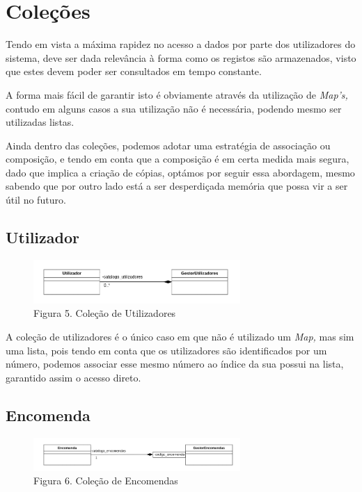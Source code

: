 \chapter{Coleções}

    Tendo em vista a máxima rapidez no acesso a dados por parte dos utilizadores do sistema, deve ser dada relevância à forma como os registos são armazenados, visto que estes devem poder ser consultados em tempo constante.

    A forma mais fácil de garantir isto é obviamente através da utilização de \textit{Map's,} contudo em alguns casos a sua utilização não é necessária, podendo mesmo ser utilizadas listas.

    Ainda dentro das coleções, podemos adotar uma estratégia de associação ou composição, e tendo em conta que a composição é em certa medida mais segura, dado que implica a criação de cópias, optámos por seguir essa abordagem, mesmo sabendo que por outro lado está a ser desperdiçada memória que possa vir a ser útil no futuro.

    \section{Utilizador}

    \begin{figure}[hb!]
        \centering
        \vspace{-10pt}
        \includegraphics[width=0.7\textwidth]{imagens/5.png}
        \caption*{Figura 5. Coleção de Utilizadores}
    \end{figure}
    \vspace{8pt}

    A coleção de utilizadores é o único caso em que não é utilizado um \textit{Map,} mas sim uma lista, pois tendo em conta que os utilizadores são identificados por um número, podemos associar esse mesmo número ao índice da sua possui na lista, garantido assim o acesso direto.

    \section{Encomenda}

    \begin{figure}[hb!]
        \centering
        \vspace{-5pt}
        \includegraphics[width=0.7\textwidth]{imagens/14.png}
        \caption*{Figura 6. Coleção de Encomendas}
        \vspace{5pt}
    \end{figure}
    \vspace{8pt}


